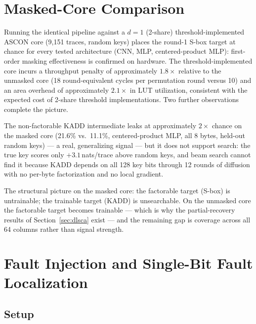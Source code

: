 \documentclass[conference]{IEEEtran}
\begin{document}
\section{Masked-Core Comparison}
\label{sec:masked}

Running the identical pipeline against a $d\!=\!1$ (2-share)
threshold-implemented ASCON core (9{,}151 traces, random keys)
places the round-1 S-box target at chance for every tested
architecture (CNN, MLP, centered-product MLP): first-order
masking effectiveness is confirmed on hardware. The
threshold-implemented core incurs a throughput penalty of
approximately $1.8\times$ relative to the unmasked core (18
round-equivalent cycles per permutation round versus 10) and an
area overhead of approximately $2.1\times$ in LUT utilization,
consistent with the expected cost of 2-share threshold
implementations. Two further observations complete the picture.

The non-factorable KADD intermediate leaks at approximately
$2\times$ chance on the masked core (21.6\% vs.\ 11.1\%,
centered-product MLP, all 8 bytes, held-out random keys) — a
real, generalizing signal — but it does not support search: the
true key scores only $+3.1$\,nats/trace above random keys, and
beam search cannot find it because KADD depends on all 128 key
bits through 12 rounds of diffusion with no per-byte
factorization and no local gradient.

The structural picture on the masked core: the factorable target
(S-box) is untrainable; the trainable target (KADD) is
unsearchable. On the unmasked core the factorable target becomes
trainable — which is why the partial-recovery results of
Section~\ref{sec:dlsca} exist — and the remaining gap is
coverage across all 64 columns rather than signal strength.

\section{Fault Injection and Single-Bit Fault Localization}
\label{sec:fi}

\subsection{Setup}
\end{document}
